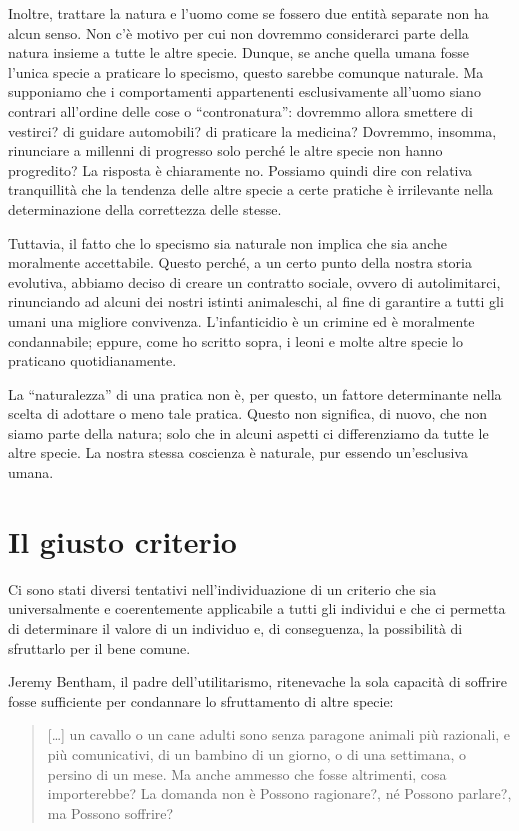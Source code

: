 \documentclass[a4paper,11pt,oneside,article]{memoir}
\begin{document}
Inoltre, trattare la natura e l'uomo come se fossero due entità separate non ha
alcun senso. Non c'è motivo per cui non dovremmo considerarci parte della natura
insieme a tutte le altre specie. Dunque, se anche quella umana fosse l'unica
specie a praticare lo specismo, questo sarebbe comunque naturale. Ma supponiamo
che i comportamenti appartenenti esclusivamente all'uomo siano contrari
all'ordine delle cose o ``contronatura'': dovremmo allora smettere di vestirci?
di guidare automobili? di praticare la medicina? Dovremmo, insomma, rinunciare a
millenni di progresso solo perché le altre specie non hanno progredito? La
risposta è chiaramente no. Possiamo quindi dire con relativa tranquillità che la
tendenza delle altre specie a certe pratiche è irrilevante nella determinazione
della correttezza delle stesse.

Tuttavia, il fatto che lo specismo sia naturale non implica che sia anche
moralmente accettabile. Questo perché, a un certo punto della nostra storia
evolutiva, abbiamo deciso di creare un contratto sociale, ovvero di
autolimitarci, rinunciando ad alcuni dei nostri istinti animaleschi, al fine di
garantire a tutti gli umani una migliore convivenza. L'infanticidio è un crimine
ed è moralmente condannabile; eppure, come ho scritto sopra, i leoni e molte
altre specie lo praticano quotidianamente.

La ``naturalezza'' di una pratica non è, per questo, un fattore determinante
nella scelta di adottare o meno tale pratica. Questo non significa, di nuovo,
che non siamo parte della natura; solo che in alcuni aspetti ci differenziamo da
tutte le altre specie. La nostra stessa coscienza è naturale, pur essendo
un'esclusiva umana.

\chapter{Il giusto criterio}

Ci sono stati diversi tentativi nell'individuazione di un criterio che sia
universalmente e coerentemente applicabile a tutti gli individui e che ci
permetta di determinare il valore di un individuo e, di conseguenza, la
possibilità di sfruttarlo per il bene comune.

Jeremy Bentham, il padre dell'utilitarismo, riteneva\footnotemark[1] che la sola
capacità di soffrire fosse sufficiente per condannare lo sfruttamento di altre
specie:

\begin{quotation}

[…] un cavallo o un cane adulti sono senza paragone animali più razionali, e più
comunicativi, di un bambino di un giorno, o di una settimana, o persino di un
mese. Ma anche ammesso che fosse altrimenti, cosa importerebbe? La domanda non è
Possono ragionare?, né Possono parlare?, ma Possono soffrire?

\end{quotation}
\end{document}
